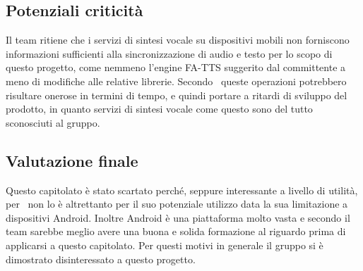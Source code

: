 \documentclass[../StudioDiFattibilita.tex]{subfiles}
\begin{document}
		\subsection{Potenziali criticità}
		Il team ritiene che i servizi di sintesi vocale su dispositivi mobili non forniscono informazioni sufficienti alla sincronizzazione di audio e testo per lo scopo di questo progetto, come nemmeno l'engine FA-TTS suggerito dal committente a meno di modifiche alle relative librerie. Secondo \kpanic\ queste operazioni potrebbero risultare onerose in termini di tempo, e quindi portare a ritardi di sviluppo del prodotto, in quanto servizi di sintesi vocale come questo sono del tutto sconosciuti al gruppo.

	\subsection{Valutazione finale}
	Questo capitolato è stato scartato perché, seppure interessante a livello di utilità, per \kpanic\ non lo è altrettanto per il suo potenziale utilizzo data la sua limitazione a dispositivi Android. Inoltre Android è una piattaforma molto vasta e secondo il team sarebbe meglio avere una buona e solida formazione al riguardo prima di applicarsi a questo capitolato. Per questi motivi in generale il gruppo si è dimostrato disinteressato a questo progetto.
\end{document}
